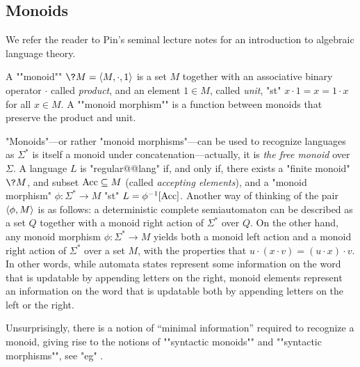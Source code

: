 \subsection{Monoids}

We refer the reader to Pin's seminal lecture notes \cite{Pin2022MathematicalFoundations}
for an introduction to algebraic language theory.

A \AP""monoid"" $\?M = \tup{M,{\cdot},1}$ is a set $M$ together with an associative binary operator $\cdot$ called \emph{product}, and an element $1 \in M$, called \emph{unit}, "st" $x\cdot 1 = x = 1 \cdot x$ for all $x\in M$.
A \AP""monoid morphism"" is a function between monoids that preserve the product and unit.

"Monoids"---or rather "monoid morphisms"---can be used to recognize languages as $\Sigma^*$
is itself a monoid under concatenation---actually, it is \emph{the free monoid} over $\Sigma$.
A language $L$ is "regular@@lang" if, and only if, there exists a "finite monoid" $\?M$,
and subset $\textrm{Acc} \subseteq M$ (called \emph{accepting elements}), and a "monoid morphism"
$\phi\colon \Sigma^* \to M$ "st" $L = \phi^{-1}[\textrm{Acc}]$.
Another way of thinking of the pair $\langle\phi, M\rangle$ is as follows:
a deterministic complete semiautomaton can be described as a set $Q$ together
with a monoid right action of $\Sigma^*$ over $Q$. On the other hand,
any monoid morphism $\phi\colon \Sigma^* \to M$ yields both a monoid
left action and a monoid right action of $\Sigma^*$ over a set $M$,
with the properties that $u \cdot (x \cdot v) = (u \cdot x) \cdot v$.
In other words, while automata states represent some information on the word
that is updatable by appending letters on the right, monoid elements represent
an information on the word that is updatable both by appending letters on the left or the right. 

Unsurprisingly, there is a notion of ``minimal information'' required to recognize a monoid,
giving rise to the notions of ""syntactic monoids"" and ""syntactic morphisms"",
see "eg" \cite[Theorem~1.7]{Bojanczyk2020MSO}.

